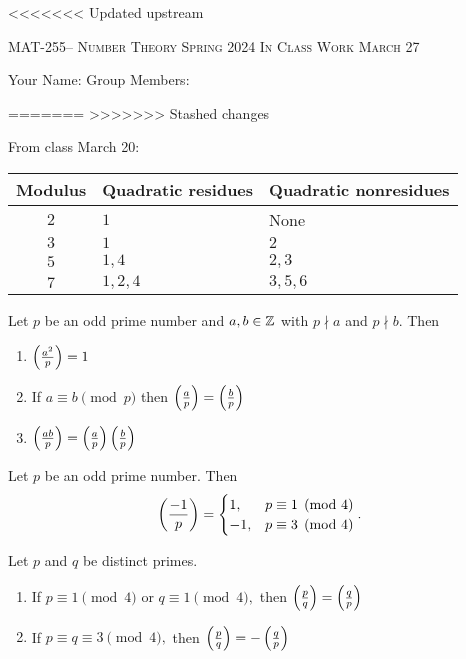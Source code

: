 \documentclass[handout]{ximera}
\date{March 27, 2024}
\date{\classday, 2024}
\begin{document}
\handoutAbstract
\maketitle
<<<<<<< Updated upstream
 	\begin{center}%
    	{\large \scshape MAT-255-- Number Theory 
			\hfill Spring 2024 
			\hfill In Class Work March 27}%
    
		{\large Your Name: \hrulefill \quad 
			Group Members:\hrulefill \quad 
			\hrulefill
			\par}%
 	\end{center}%
=======
>>>>>>> Stashed changes
	 
From class March 20:

\begin{tabular}{cll}
	Modulus & Quadratic residues & Quadratic nonresidues\\\hline
	$2$	& $1$ 	& None\\
	$3$	& $1$	& $2$\\
	$5$	& $1,4$	& $2,3$\\
	$7$	& $1,2,4$	& $3,5,6$
\end{tabular}

\begin{proposition}[Proposition 4.5]
	Let $p$ be an odd prime number and $a,b\in\mathbb Z$ with $p\nmid a$ and $p\nmid b.$ Then 
	\begin{enumerate}[label=(\alph*)]
		\item $\left(\frac{a^2}{p}\right)=1$ \label{squares-are-square}
		\item If $a\equiv b\pmod{p}$ then $\left(\frac{a}{p}\right)=\left(\frac{b}{p}\right)$ \label{legendre-respects-mod}
		\item $\left(\frac{ab}{p}\right)=\left(\frac{a}{p}\right)\left(\frac{b}{p}\right)$ \label{legendre-mult}
	\end{enumerate}
\end{proposition}

\begin{theorem}[Theorem 4.6]\label{thm:residue-neg1}
	Let $p$ be an odd prime number. Then 
	\[
		\left(\frac{-1}{p}\right)=
			\begin{cases}
 				1, & p\equiv 1\pmod{4}\\
				-1, & p\equiv 3\pmod{4}
			\end{cases}.
	\]
\end{theorem}

\begin{theorem}\label{quad-rec}
	Let $p$ and $q$ be distinct primes.  
	\begin{enumerate}[label=(\alph*)]
		\item If $p\equiv 1 \pmod{4}$ or $q\equiv 1\pmod{4},$ then $\left(\frac{p}{q}\right)=\left(\frac{q}{p}\right)$
 		\item If $p\equiv q \equiv 3 \pmod{4},$ then $\left(\frac{p}{q}\right)=-\left(\frac{q}{p}\right)$
	\end{enumerate}
\end{theorem}
\end{document}
